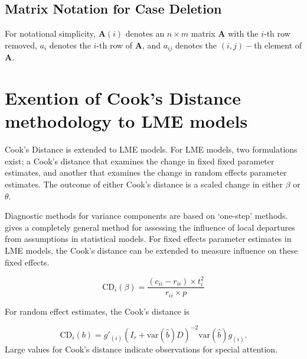\documentclass[12pt, a4paper]{article}
\begin{document}
\subsection{Matrix Notation for Case Deletion} %


For notational simplicity, $\boldsymbol{A}(i)$ denotes an $n \times m$ matrix $\boldsymbol{A}$ with the $i$-th row
removed, $a_i$ denotes the $i$-th row of $\boldsymbol{A}$, and $a_{ij}$ denotes the $(i, j)-$th element of $\boldsymbol{A}$.
%








\section{Exention of Cook's Distance methodology to LME models}
 Cook's Distance is extended to LME models.  For LME models, two formulations exist; a Cook's distance that examines the change in fixed fixed parameter estimates, and another that examines the change in random effects parameter estimates. The outcome of either Cook's distance is a scaled change in either $\beta$ or $\theta$.

Diagnostic methods for variance components are based on `one-step' methods. \citet{cook86} gives a completely general method for assessing the influence of local departures from assumptions in statistical models. For fixed effects parameter estimates in LME models, the  Cook's distance can be extended to measure influence on these fixed effects.

\[
\mbox{CD}_{i}(\beta) = \frac{(c_{ii} - r_{ii}) \times t^2_{i}}{r_{ii} \times p}
\]

For random effect estimates, the  Cook's distance is

\[
\mbox{CD}_{i}(b) = g{\prime}_{(i)} (I_{r} + \mbox{var}(\hat{b})D)^{-2}\mbox{var}(\hat{b})g_{(i)}.
\]
Large values for Cook's distance indicate observations for special attention.
\end{document}
